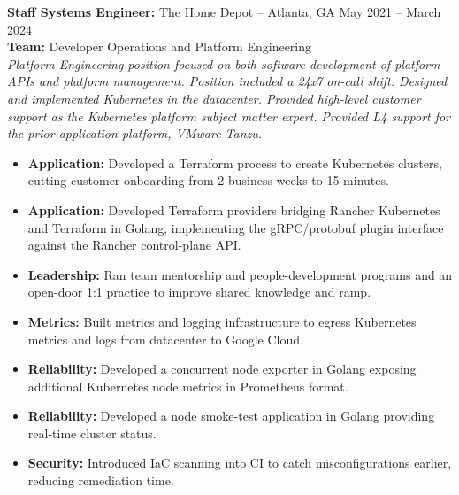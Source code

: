 \documentclass[11pt]{article}       %
\begin{document}
\begin{description}
\item\textbf{Staff Systems Engineer:} {The Home Depot} -- Atlanta, GA \hfill May 2021 -- March 2024 \\
\textbf{Team:} Developer Operations and Platform Engineering \\
\textit{Platform Engineering position focused on both software development of platform APIs and platform management. Position included a 24x7 on-call shift. Designed and implemented Kubernetes in the datacenter. Provided high-level customer support as the Kubernetes platform subject matter expert. Provided L4 support for the prior application platform, VMware Tanzu.} \\
\vspace{-6.5pt}
\begin{itemize}
  \item \textbf{Application:} Developed a Terraform process to create Kubernetes clusters, cutting customer onboarding from 2 business weeks to 15 minutes.
  \item \textbf{Application:} Developed Terraform providers bridging Rancher Kubernetes and Terraform in Golang, implementing the gRPC/protobuf plugin interface against the Rancher control-plane API.
  \item \textbf{Leadership:} Ran team mentorship and people-development programs and an open-door 1:1 practice to improve shared knowledge and ramp.
  \item \textbf{Metrics:} Built metrics and logging infrastructure to egress Kubernetes metrics and logs from datacenter to Google Cloud.
  \item \textbf{Reliability:} Developed a concurrent node exporter in Golang exposing additional Kubernetes node metrics in Prometheus format.
  \item \textbf{Reliability:} Developed a node smoke-test application in Golang providing real-time cluster status.
  \item \textbf{Security:} Introduced IaC scanning into CI to catch misconfigurations earlier, reducing remediation time.
\end{itemize}
\end{description}
\end{document}
